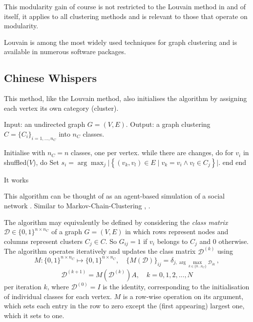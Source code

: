 \documentclass[12pt, a4paper]{article}
\begin{document}
  This modularity gain of course is not restricted to the Louvain method in and of itself, it applies to all clustering methods and is relevant to those that operate on modularity.

  Louvain is among the most widely used techniques for graph clustering and is available in numerous software packages.

  \subsection{Chinese Whispers}
  This method, like the Louvain method, also initialises the algorithm by assigning each vertex its own category (cluster).

  \begin{algorithm}[language=pseudo, caption={\centering The \textit{Chinese Whispers} algorithm due to \cite{cw-biemann}}]
Input: an undirected graph $G = (V, E)$.
Output: a graph clustering $C = \{C_i\}_{i=1, ..., n_C}$ into $n_C$ classes.

Initialise with $n_C = n$ classes, one per vertex.
while there are changes, do
  for $v_i$ in shuffled($V$), do
    Set $s_i = \arg\max_{j} \big|\left\{(v_k, v_l) \in E \;|\; v_k = v_i \wedge v_l \in C_j\right\}\big|$.
  end
end
  \end{algorithm}

  It works

  This algorithm can be thought of as an agent-based simulation of a social network \cite{cw-biemann}.
  Similar to Markov-Chain-Clustering \cite{van-dongen}, \cite{fortunato}.

  The algorithm may equivalently be defined by considering the \textit{class matrix} $\mathcal{D} \in \{0, 1\}^{n \times n_C}$ of a graph $G = (V, E)$ in which rows represent nodes and columns represent clusters $C_j \in C$.
  So $G_{ij} = 1$ if $v_i$ belongs to $C_j$ and $0$ otherwise.
  The algorithm operates iteratively and updates the class matrix $\mathcal{D}^{(k)}$ using
  $$M: \{0, 1\}^{n \times n_C} \mapsto \{0, 1\}^{n \times n_C}, \quad \{M(\mathcal{D})\}_{ij} = \delta_{j,\arg\max_{k\in \{0...n_C\}} \mathcal{D}_{ik}}\,,$$
  $$\mathcal{D}^{(k+1)} = M(\mathcal{D}^{(k)}) A, \quad k = 0, 1, 2, ..., N$$
  per iteration $k$, where $\mathcal{D}^{(0)} = I$ is the identity, corresponding to the initialisation of individual classes for each vertex.
  $M$ is a row-wise operation on its argument, which sets each entry in the row to zero except the (first appearing) largest one, which it sets to one.
\end{document}
